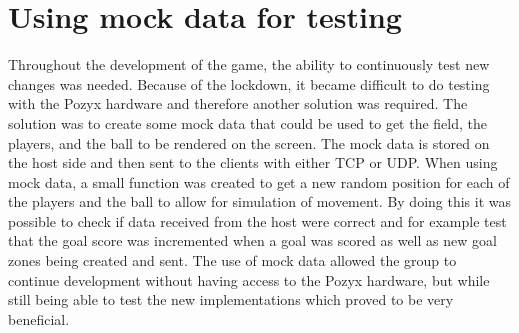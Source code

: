 \section{Using mock data for testing}
Throughout the development of the game, the ability to continuously test new changes was needed.
Because of the lockdown, it became difficult to do testing with the Pozyx hardware and therefore another solution was required.
The solution was to create some mock data that could be used to get the field, the players, and the ball to be rendered on the screen.
The mock data is stored on the host side and then sent to the clients with either TCP or UDP.
When using mock data, a small function was created to get a new random position for each of the players and the ball to allow for simulation of movement.
By doing this it was possible to check if data received from the host were correct and for example test that the goal score was incremented when a goal was scored as well as new goal zones being created and sent.
The use of mock data allowed the group to continue development without having access to the Pozyx hardware, but while still being able to test the new implementations which proved to be very beneficial.